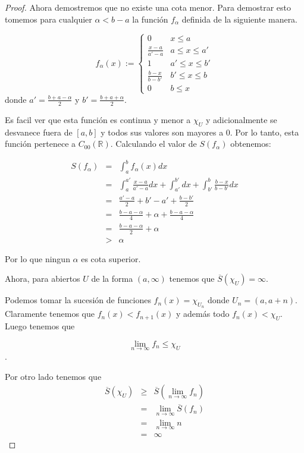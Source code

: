 \documentclass[letter,twoside,12pt]{article}
\begin{document}
\begin{enumerate}
\begin{enumerate}
\begin{proof}
Ahora demostremos que no existe una cota menor. Para demostrar esto tomemos para cualquier $\alpha < b -a $ la función $ f_\alpha $ definida de la siguiente manera.

$$ f_\alpha(x) :=
    \begin{cases}
      0 & x\leq a \\
      \frac{x-a}{a'-a} & a \leq x \leq a'\\
      1 & a'\leq x \leq b' \\
      \frac{b-x}{b-b'} & b' \leq x \leq b\\
      0 & b \leq x
    \end{cases}
$$
donde $ \displaystyle a'= \frac{b+a-\alpha}{2}$ y $\displaystyle b'= \frac{b+a+\alpha}{2}$.

Es facil ver que esta función es continua y menor a $\chi_U $ y adicionalmente se desvanece fuera de $[a,b]$ y todos sus valores son mayores a 0. Por lo tanto, esta función pertenece a $C_00(\mathbb{R})$. Calculando el valor de $S(f_\alpha)$ obtenemos:

\begin{eqnarray*}
S(f_\alpha) & = & \int_a^b f_\alpha(x) dx \\
&=& \int_a^{a'} \frac{x-a}{a'-a} dx + \int_{a'}^{b'} dx +\int_{b'}^{b} \frac{b-x}{b-b'} dx \\
&=& \frac{a'-a}{2} + b'-a' + \frac{b-b'}{2}\\
&=& \frac{b-a-\alpha}{4} + \alpha + \frac{b-a-\alpha}{4}\\
&=& \frac{b-a-\alpha}{2}+\alpha\\
&>& \alpha 
\end{eqnarray*}

Por lo que ningun $\alpha$ es cota superior.

Ahora, para abiertos $ U $ de la forma $(a,\infty)$ tenemos que $ \overline{S}(\chi_U) = \infty $.

Podemos tomar la sucesión de funciones $f_n (x) = \chi_{U_n}$ donde $U_n = (a,a+n) $. Claramente tenemos que $ f_n(x) < f_{n+1}(x)$ y además todo $f_n(x) < \chi_U $. Luego tenemos que 

$$ \lim_{n \to \infty} f_n \leq \chi_U $$.

Por otro lado tenemos que 
\begin{eqnarray*}
\overline{S}(\chi_U)  &\geq& \overline{S}(\lim_{n \to \infty} f_n)\\ &=& \lim_{n \to \infty} \overline{S}(f_n) \\
&=& \lim_{n \to \infty} n \\
&=& \infty
\end{eqnarray*}


\end{proof}
\end{enumerate}
\end{enumerate}
\end{document}
